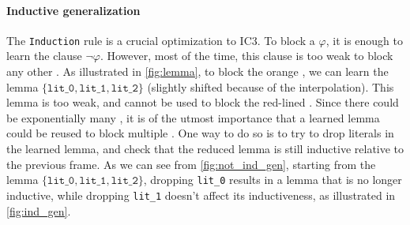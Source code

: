 \paragraph{Inductive generalization}
The \texttt{Induction} rule is a crucial optimization to IC3. To block a \pob
$\varphi$, it is enough to learn the clause $\lnot \varphi$. However, most of the
time, this clause is too weak to block any other \pob. As illustrated in
\cref{fig:lemma}, to block the orange \pob, we can learn the lemma
$\{\texttt{lit\_0}, \texttt{lit\_1}, \texttt{lit\_2}\}$ (slightly shifted because of the interpolation). This
lemma is too weak, and cannot be used to block the red-lined \pob. Since there
could be exponentially many \pobs, it is of the utmost importance that a learned
lemma could be reused to block multiple \pobs. One way to do so is to try to
drop literals in the learned lemma, and check that the reduced lemma is still
inductive relative to the previous frame.
As we can see from \cref{fig:not_ind_gen}, starting from the lemma $\{\texttt{lit\_0}, \texttt{lit\_1}, \texttt{lit\_2}\}$, dropping \texttt{lit\_0} results in a lemma that is no longer inductive, while dropping \texttt{lit\_1} doesn't affect its inductiveness, as illustrated in \cref{fig:ind_gen}.

